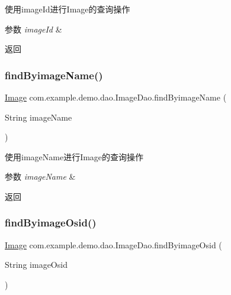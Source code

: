 使用image\+Id进行\+Image的查询操作 
\begin{DoxyParams}{参数}
{\em image\+Id} & \\
\hline
\end{DoxyParams}
\begin{DoxyReturn}{返回}

\end{DoxyReturn}
\mbox{\label{interfacecom_1_1example_1_1demo_1_1dao_1_1_image_dao_a500c4a6d4248bd640b7f7923f8c98eea}} 
\subsubsection{\texorpdfstring{find\+Byimage\+Name()}{findByimageName()}}
{\footnotesize\ttfamily \mbox{\hyperlink{classcom_1_1example_1_1demo_1_1modular_1_1_image}{Image}} com.\+example.\+demo.\+dao.\+Image\+Dao.\+find\+Byimage\+Name (\begin{DoxyParamCaption}\item[{String}]{image\+Name }\end{DoxyParamCaption})}

使用image\+Name进行\+Image的查询操作 
\begin{DoxyParams}{参数}
{\em image\+Name} & \\
\hline
\end{DoxyParams}
\begin{DoxyReturn}{返回}

\end{DoxyReturn}
\mbox{\label{interfacecom_1_1example_1_1demo_1_1dao_1_1_image_dao_ac4588a72e5399dbd2ba93bc19ed56ccb}} 
\subsubsection{\texorpdfstring{find\+Byimage\+Osid()}{findByimageOsid()}}
{\footnotesize\ttfamily \mbox{\hyperlink{classcom_1_1example_1_1demo_1_1modular_1_1_image}{Image}} com.\+example.\+demo.\+dao.\+Image\+Dao.\+find\+Byimage\+Osid (\begin{DoxyParamCaption}\item[{String}]{image\+Osid }\end{DoxyParamCaption})}


